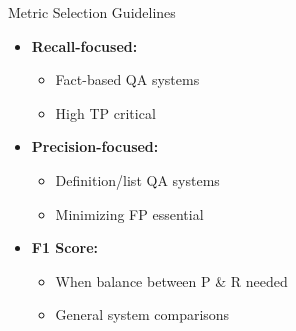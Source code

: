 \begin{frame}{Metric Selection Guidelines}
\begin{itemize}
    \item \textbf{Recall-focused:}
    \begin{itemize}
        \item Fact-based QA systems
        \item High TP critical
    \end{itemize}

    \item \textbf{Precision-focused:}
    \begin{itemize}
        \item Definition/list QA systems
        \item Minimizing FP essential
    \end{itemize}

    \item \textbf{F1 Score:}
    \begin{itemize}
        \item When balance between P \& R needed
        \item General system comparisons
    \end{itemize}
\end{itemize}
\end{frame}


